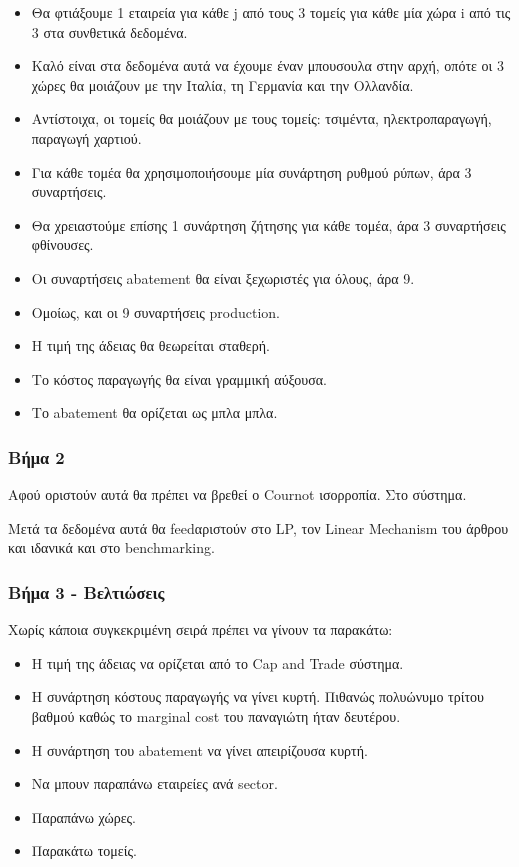 \documentclass[a4paper,twoside,10pt]{article}
\begin{document}
\begin{itemize}
	\item Θα φτιάξουμε 1 εταιρεία για κάθε j από τους 3 τομείς για κάθε μία χώρα i από τις 3 στα συνθετικά δεδομένα. 
	\item  Καλό είναι στα δεδομένα αυτά να έχουμε έναν μπουσουλα στην αρχή, οπότε οι 3 χώρες θα μοιάζουν με την Ιταλία, τη Γερμανία και την Ολλανδία. 
	\item Αντίστοιχα, οι τομείς θα μοιάζουν με τους τομείς: τσιμέντα, ηλεκτροπαραγωγή, παραγωγή χαρτιού.
	\item Για κάθε τομέα θα χρησιμοποιήσουμε μία συνάρτηση ρυθμού ρύπων, άρα 3 συναρτήσεις.
	\item Θα χρειαστούμε επίσης 1  συνάρτηση ζήτησης για κάθε τομέα, άρα 3 συναρτήσεις φθίνουσες.
	\item Οι συναρτήσεις abatement θα είναι ξεχωριστές για όλους, άρα 9.
	\item Ομοίως, και οι 9 συναρτήσεις production. 
	\item Η τιμή της άδειας θα θεωρείται σταθερή.
	\item Το κόστος παραγωγής θα είναι γραμμική αύξουσα.
	\item Το abatement θα ορίζεται ως μπλα μπλα.
\end{itemize}

\subsubsection{Βήμα 2}

Αφού οριστούν αυτά θα πρέπει να βρεθεί ο Cournot ισορροπία. Στο σύστημα.

Μετά τα δεδομένα αυτά θα feedαριστούν στο LP, τον Linear Mechanism του άρθρου \cite{Allocating} και ιδανικά και στο benchmarking. 

\subsubsection{Βήμα 3 - Βελτιώσεις}
Χωρίς κάποια συγκεκριμένη σειρά πρέπει να γίνουν τα παρακάτω:
\begin{itemize}
	\item Η τιμή της άδειας να ορίζεται από το Cap and Trade σύστημα.
	\item H συνάρτηση κόστους παραγωγής να γίνει κυρτή. Πιθανώς πολυώνυμο τρίτου βαθμού καθώς το marginal cost του παναγιώτη ήταν δευτέρου.
	\item Η συνάρτηση του abatement να γίνει απειρίζουσα κυρτή.
	\item Να μπουν παραπάνω εταιρείες ανά sector.
	\item Παραπάνω χώρες. 
	\item Παρακάτω τομείς. 
\end{itemize}
\end{document}
